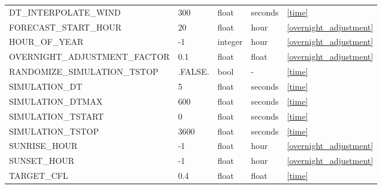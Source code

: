 \begin{landscape}
\begin{center}
\begin{longtable}{lllll}
DT\_INTERPOLATE\_WIND                        & 300                        & float                  & seconds                            & \ref{time}                           \\
FORECAST\_START\_HOUR                        & 20                         & float                  & hour                               & \ref{overnight_adjustment}           \\
HOUR\_OF\_YEAR                               & -1                         & integer                & hour                               & \ref{overnight_adjustment}           \\
OVERNIGHT\_ADJUSTMENT\_FACTOR                & 0.1                        & float                  & float                              & \ref{overnight_adjustment}           \\
RANDOMIZE\_SIMULATION\_TSTOP                 & .FALSE.                    & bool                   & -                                  & \ref{time}                           \\
SIMULATION\_DT                               & 5                          & float                  & seconds                            & \ref{time}                           \\
SIMULATION\_DTMAX                            & 600                        & float                  & seconds                            & \ref{time}                           \\
SIMULATION\_TSTART                           & 0                          & float                  & seconds                            & \ref{time}                           \\
SIMULATION\_TSTOP                            & 3600                       & float                  & seconds                            & \ref{time}                           \\
SUNRISE\_HOUR                                & -1                         & float                  & hour                               & \ref{overnight_adjustment}           \\
SUNSET\_HOUR                                 & -1                         & float                  & hour                               & \ref{overnight_adjustment}           \\
TARGET\_CFL                                  & 0.4                        & float                  & float                              & \ref{time}                           \\

\end{longtable}
\end{center}
\end{landscape}
